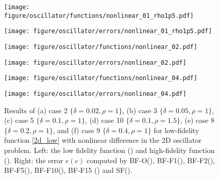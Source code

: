 \documentclass[11pt]{article}
\begin{document}
\begin{figure}
\centering
\begin{minipage}[b]{0.45\linewidth}
\texttt{[image: figure/oscillator/functions/nonlinear\_01\_rho1p5.pdf]}
\end{minipage}
\begin{minipage}[b]{0.47\linewidth}
\texttt{[image: figure/oscillator/errors/nonlinear\_01\_rho1p5.pdf]}
\end{minipage}
\begin{minipage}[b]{0.45\linewidth}
\texttt{[image: figure/oscillator/functions/nonlinear\_02.pdf]}
\end{minipage}
\begin{minipage}[b]{0.47\linewidth}
\texttt{[image: figure/oscillator/errors/nonlinear\_02.pdf]}
\end{minipage}
\begin{minipage}[b]{0.45\linewidth}
\texttt{[image: figure/oscillator/functions/nonlinear\_04.pdf]}
\end{minipage}
\begin{minipage}[b]{0.47\linewidth}
\texttt{[image: figure/oscillator/errors/nonlinear\_04.pdf]}
\end{minipage}
\caption{Results of (a) case 2 $\{\delta=0.02, \rho=1\}$, (b) case 3 $\{\delta=0.05, \rho=1\}$, (c) case 5 $\{\delta=0.1, \rho=1\}$, (d) case 10 $\{\delta=0.1, \rho=1.5\}$, (e) case 8 $\{\delta=0.2, \rho=1\}$, and (f) case 9 $\{\delta=0.4, \rho=1\}$ for low-fidelity function \eqref{2d_low} with nonlinear difference in the 2D oscillator problem. Left: the low fidelity function (\redline) and high-fidelity function (\blackline). Right: the error $e(c)$ computed by BF-O(\blackline), BF-F1(\orangedashedline), BF-F2(\greendashedline), BF-F5(\reddashedline), BF-F10(\purpledashedline), BF-F15 (\browndashedline) and SF(\blueline).}
\label{fig:os_nonlinear_n}
\end{figure}
\end{document}
